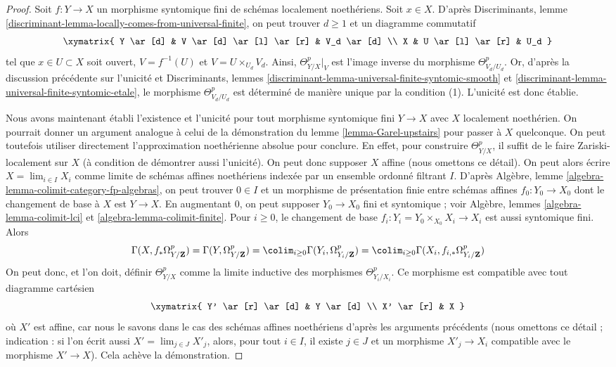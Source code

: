\begin{proof}
\medskip\noindent
Soit $f : Y \to X$ un morphisme syntomique fini de schémas localement noethériens.
Soit $x \in X$. D'après Discriminants, lemme
\ref{discriminant-lemma-locally-comes-from-universal-finite},
on peut trouver $d \geq 1$ et un diagramme commutatif
$$
\xymatrix{
Y \ar[d] &
V \ar[d] \ar[l] \ar[r] &
V_d \ar[d] \\
X &
U \ar[l] \ar[r] &
U_d
}
$$
tel que $x \in U \subset X$ soit ouvert, $V = f^{-1}(U)$
et $V = U \times_{U_d} V_d$. Ainsi, $\Theta^p_{Y/X}|_V$
est l'image inverse du morphisme $\Theta^p_{V_d/U_d}$.
Or, d'après la discussion précédente sur l'unicité et
Discriminants, lemmes
\ref{discriminant-lemma-universal-finite-syntomic-smooth} et
\ref{discriminant-lemma-universal-finite-syntomic-etale},
le morphisme $\Theta^p_{V_d/U_d}$ est déterminé de manière unique
par la condition (1). L'unicité est donc établie.

\medskip\noindent
Nous avons maintenant établi l'existence et l'unicité
pour tout morphisme syntomique fini $Y \to X$ avec $X$ localement noethérien.
On pourrait donner un argument analogue à celui de la démonstration du
lemme \ref{lemma-Garel-upstairs} pour passer à $X$ quelconque.
On peut toutefois utiliser directement
l'approximation noethérienne absolue pour conclure.
En effet, pour construire $\Theta^p_{Y/X}$,
il suffit de le faire Zariski-localement sur $X$ (à condition de
démontrer aussi l'unicité). On peut donc supposer $X$ affine (nous omettons
ce détail). On peut alors écrire $X = \lim_{i \in I} X_i$
comme limite de schémas affines noethériens indexée par un ensemble ordonné filtrant $I$.
D'après Algèbre, lemme \ref{algebra-lemma-colimit-category-fp-algebras},
on peut trouver $0 \in I$ et un morphisme de présentation
finie entre schémas affines $f_0 : Y_0 \to X_0$ dont le changement de base à
$X$ est $Y \to X$. En augmentant $0$, on peut supposer $Y_0 \to X_0$
fini et syntomique ; voir
Algèbre, lemmes \ref{algebra-lemma-colimit-lci} et
\ref{algebra-lemma-colimit-finite}. Pour $i \geq 0$, le
changement de base $f_i : Y_i = Y_0 \times_{X_0} X_i \to X_i$ est aussi syntomique fini.
Alors
$$
\Gamma(X, f_*\Omega^p_{Y/\mathbf{Z}}) =
\Gamma(Y, \Omega^p_{Y/\mathbf{Z}}) =
\colim_{i \geq 0} \Gamma(Y_i, \Omega^p_{Y_i/\mathbf{Z}}) =
\colim_{i \geq 0} \Gamma(X_i, f_{i, *}\Omega^p_{Y_i/\mathbf{Z}})
$$
On peut donc, et l'on doit, définir $\Theta^p_{Y/X}$ comme la limite inductive
des morphismes $\Theta^p_{Y_i/X_i}$. Ce morphisme est compatible avec tout
diagramme cartésien
$$
\xymatrix{
Y' \ar[r] \ar[d] & Y \ar[d] \\
X' \ar[r] & X
}
$$
où $X'$ est affine, car nous le savons dans le cas des schémas affines noethériens
d'après les arguments précédents (nous omettons ce détail ; indication : si l'on
écrit aussi $X' = \lim_{j \in J} X'_j$, alors, pour tout $i \in I$, il existe $j \in J$
et un morphisme $X'_j \to X_i$ compatible avec le morphisme $X' \to X$).
Cela achève la démonstration.
\end{proof}

